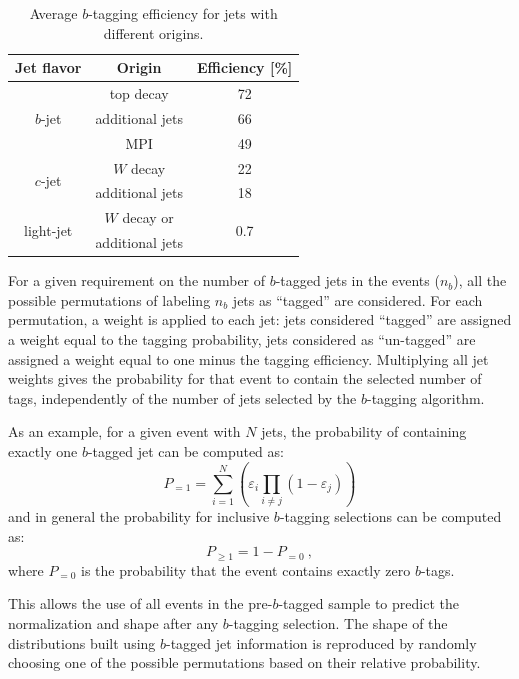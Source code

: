 \begin{table}[!t]
\centering
\begin{tabular}{ c c c }
\toprule
\toprule
Jet flavor & Origin & Efficiency [\%]  \\
\midrule
\multirow{3}{*}{$b$-jet} & top decay       & 72 \\
                         & additional jets & 66 \\
                         & MPI             & 49 \\
\midrule
\multirow{2}{*}{$c$-jet} & $W$ decay         & 22 \\
                         & additional jets & 18 \\
\midrule
\multirow{2}{*}{light-jet} & $W$ decay or    & \multirow{2}{*}{0.7} \\
                         & additional jets &  \\
\bottomrule
\bottomrule
\end{tabular}
\caption{
Average $b$-tagging efficiency for jets with different origins.
}
\label{tab:btag_eff}
\end{table}

For a given requirement on the number of $b$-tagged jets in the events ($n_b$), all the possible permutations of labeling $n_b$ jets as ``tagged'' are considered. 
For each permutation, a weight is applied to each jet: jets considered ``tagged'' are assigned a weight equal to the tagging probability, jets considered as ``un-tagged'' are assigned a weight equal to one minus the tagging efficiency. 
Multiplying all jet weights gives the probability for that event to contain the selected number of tags, independently of the number of jets selected by the $b$-tagging algorithm.

As an example, for a given event with $N$ jets, the probability of containing exactly one $b$-tagged jet can be computed as:
\begin{equation}
	P_{=1} = \sum\limits_{i=1}^N \left( \varepsilon_{i} \prod\limits_{i \neq j} \left( 1 - \varepsilon_{j} \right) \right)
\end{equation}
and in general the probability for inclusive $b$-tagging selections can be computed as:
\begin{equation}
  P_{\geq 1} = 1 - P_{=0}~,
\end{equation}
where $P_{=0}$ is the probability that the event contains exactly zero $b$-tags.


This allows the use of all events in the pre-$b$-tagged sample to predict the normalization and shape after any $b$-tagging selection.
The shape of the distributions built using $b$-tagged jet information is reproduced by randomly choosing one of the possible permutations based on their relative probability.

